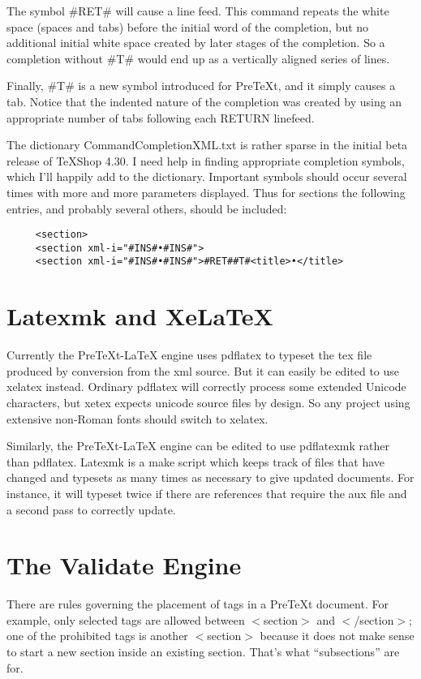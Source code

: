 \documentclass[11pt, oneside]{article}   	%
\begin{document}
The symbol \#RET\# will cause a line feed. This command repeats the white space (spaces and tabs) before the initial word of the completion, but no additional initial white space created by later stages of the completion.
So a completion without \#T\# would end up as a vertically aligned series of lines.

Finally, \#T\# is a new symbol introduced for PreTeXt, and it simply causes a tab. Notice that the indented nature of the completion was created by using an appropriate number of tabs following each RETURN linefeed.

The dictionary CommandCompletionXML.txt is rather sparse in the initial beta release of TeXShop 4.30. I need help in finding appropriate completion symbols, which I'll happily add to the dictionary. Important symbols should occur several times with more and more parameters displayed. Thus for sections the following entries, and probably several others, should be included:
\begin{verbatim}
     <section>
     <section xml-i="#INS#•#INS#">
     <section xml-i="#INS#•#INS#">#RET##T#<title>•</title>
\end{verbatim}

\section{Latexmk and XeLaTeX} 

Currently the PreTeXt-LaTeX engine uses pdflatex to typeset the tex file produced by conversion from the xml source. But it can easily be edited to use xelatex instead. Ordinary pdflatex will correctly process some extended Unicode characters, but xetex expects unicode source files by design. So any project using extensive non-Roman fonts should switch to xelatex.

Similarly, the PreTeXt-LaTeX engine can be edited to use pdflatexmk rather than pdflatex. Latexmk is a make script which keeps track of files that have changed and typesets as many times as necessary to give updated documents. For instance, it will typeset twice if there are references that require the aux file and a second pass to correctly update. 

\section{\label{validate}The Validate Engine}

There are  rules governing the placement of tags in a PreTeXt document. For example, only selected tags are allowed between $<$section$>$ and $<$/section$>$; one of the prohibited tags is another $<$section$>$ because it does not make sense to start a new section inside an existing section. That's what ``subsections'' are for.
\end{document}
